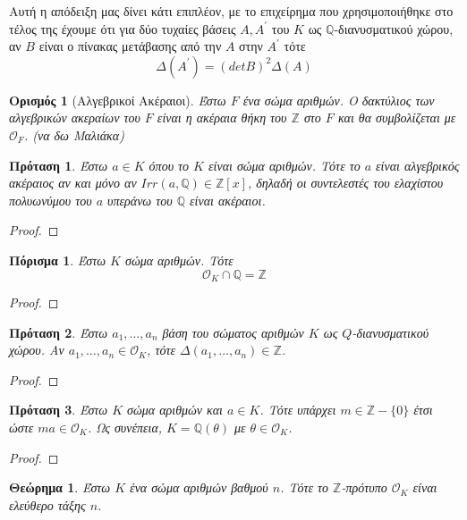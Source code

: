 \documentclass[oneside,a4paper]{article}
\newtheorem{theorem}{Θεώρημα}
\newtheorem*{defn}{Ορισμός}
\newtheorem{prop}{Πρόταση}
\newtheorem{cor}{Πόρισμα}
\newcommand{\Z}{\mathbb{Z}}
\newcommand{\Q}{\mathbb{Q}}
\begin{document}
\noindent Αυτή η απόδειξη μας δίνει κάτι επιπλέον, με το επιχείρημα που χρησιμοποιήθηκε στο τέλος της έχουμε ότι για δύο τυχαίες βάσεις $A,A^{\prime}$ του $K$ ως $\Q$-διανυσματικού χώρου, αν $B$ είναι ο πίνακας μετάβασης από την $A$ στην $A^{\prime}$ τότε $$\Delta(A^{\prime}) = (detB)^2 \Delta(A)$$
\begin{defn}[Αλγεβρικοί Ακέραιοι]
	Έστω $F$ ένα σώμα αριθμών. Ο δακτύλιος των αλγεβρικών ακεραίων του $F$ είναι η ακέραια θήκη του $\Z$ στο $F$ και θα συμβολίζεται με $\mathcal{O}_F$.
	(να δω Μαλιάκα)
\end{defn}


\begin{prop}
	Έστω $a \in K$ όπου το $K$ είναι σώμα αριθμών. Τότε το $a$ είναι αλγεβρικός ακέραιος αν και μόνο αν $Irr(a,\Q) \in \Z [x]$, δηλαδή οι συντελεστές του ελαχίστου πολυωνύμου του $a$ υπεράνω του $\Q$ είναι ακέραιοι.
\end{prop}

\begin{proof}
\end{proof}
\begin{cor}
	Έστω $K$ σώμα αριθμών. Τότε $$\mathcal{O}_K \cap \Q = \Z$$
\end{cor}
\begin{proof}
\end{proof}

\begin{prop}
	Έστω $a_1,\ldots,a_n$ βάση του σώματος αριθμών $K$ ως $Q$-διανυσματικού χώρου. Αν $a_1,\ldots,a_n \in \mathcal{O}_K$, τότε $\Delta(a_1,\ldots,a_n) \in \Z$.
\end{prop}
\begin{proof}
\end{proof}

\begin{prop}
	Έστω $K$ σώμα αριθμών και $a \in K$. Τότε υπάρχει $m\in \Z-\{0\}$ έτσι ώστε $ma \in \mathcal{O}_K$. Ως συνέπεια, $K= \Q(\theta)$ με $\theta \in \mathcal{O}_K$.
\end{prop}

\begin{proof}
\end{proof}

\begin{theorem} Έστω $K$ ένα σώμα αριθμών βαθμού $n$. Τότε το $\Z$-πρότυπο $\mathcal{O}_K$ είναι ελεύθερο τάξης $n$.
\end{theorem}
\end{document}
